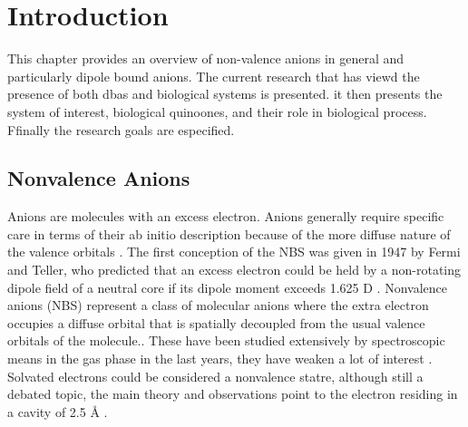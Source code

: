 \chapter{Introduction}\label{ch:introduction}

This chapter provides an overview of non-valence anions in general and particularly dipole bound anions. The current research that has viewd the presence of both dbas and biological systems is presented. it then presents the system of interest, biological quinoones, and their role in biological process. Ffinally the research goals are especified.

\section{Nonvalence Anions}
Anions are molecules with an excess electron. Anions generally require specific care in terms of their ab initio description because of the more diffuse nature of the valence
orbitals \cite{simons2008molecular,simons2023molecular}. The first conception of the NBS was given in 1947 by Fermi and Teller, who predicted that an excess electron could be held by a non-rotating dipole field of a neutral core if its dipole moment exceeds 1.625 D \cite{fermi1947capture}.
Nonvalence anions (NBS)  represent a class of molecular anions where the extra electron occupies a diffuse orbital that is spatially decoupled from the usual valence orbitals of the molecule.\cite{jordan2003theory}. These have been studied extensively by spectroscopic means in the gas phase in the last years, they have weaken a lot of interest \cite{kang2024reaction}.
Solvated electrons could be considered a nonvalence statre, although still a debated topic, the main theory and observations point to the electron residing in a cavity of 2.5 \r{A} \cite{herbert2017hydrated}.

